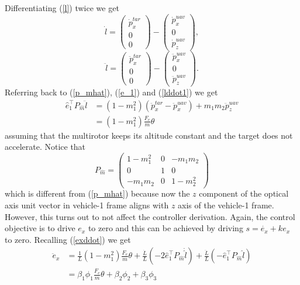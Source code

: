 Differentiating (\ref{l}) twice we get
\begin{equation}
\dot{l}=\begin{pmatrix}
\dot{p}_x^{tar} \\ 0 \\ 0
\end{pmatrix}
-\begin{pmatrix}
\dot{p}_x^{uav} \\ 0 \\ \dot{p}_z^{uav}
\end{pmatrix},
\label{ldot}
\end{equation}
\begin{equation}
\ddot{l}=\begin{pmatrix}
\ddot{p}_x^{tar} \\ 0 \\ 0
\end{pmatrix}
-\begin{pmatrix}
\ddot{p}_x^{uav} \\ 0 \\ \ddot{p}_z^{uav}
\end{pmatrix}.
\label{lddot1}
\end{equation}
Referring back to (\ref{p_mhat}), (\ref{e_1}) and (\ref{lddot1}) we get 
\begin{align}
\hat{e}_1^{\top}P_{\hat{m}}\ddot{l}&=(1-m_1^2)(\ddot{p}_x^{tar}-\ddot{p}_x^{uav})+m_1m_2\ddot{p}_z^{uav}
\\&=(1-m_1^2)\frac{F_e}{m}\theta
\end{align}
assuming that the multirotor keeps its altitude constant and the target does not accelerate. Notice that 
\begin{equation}
P_{\hat{m}}=\begin{pmatrix}1-m_1^2 & 0 & -m_1m_2 \\ 0 & 1 & 0 \\ -m_1m_2 & 0 & 1-m_2^2 \end{pmatrix}
\end{equation}
which is different from (\ref{p_mhat}) because now the $z$ component of the optical axis unit vector in vehicle-1 frame aligns with $z$ axis of the vehicle-1 frame. However, this turns out to not affect the controller derivation.  Again, the control objective is to drive $e_x$ to zero and this can be achieved by driving $s=\dot{e_x}+ke_x$ to zero.
Recalling (\ref{exddot}) we get
\begin{align}
\ddot{e}_x&=\frac{1}{L}(1-m_1^2)\frac{F_e}{m}\theta+\frac{\dot{L}}{L}(-2\hat{e}_1^{\top}P_{\hat{m}}\dot{\hat{l}})+\frac{\ddot{L}}{L}(-\hat{e}_1^{\top}P_{\hat{m}}\hat{l})
\\&=\beta_1\phi_1\frac{F_e}{m}\theta+\beta_2\phi_2+\beta_3\phi_3
\label{exddot1}
\end{align} 
